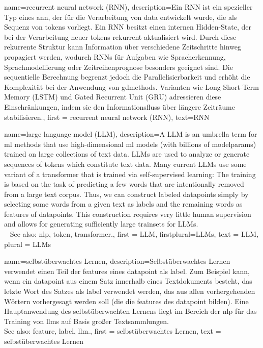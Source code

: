 {name={recurrent neural network (RNN)},
 description={Ein  RNN 
 	ist ein spezieller Typ eines \gls{ann}, der für die Verarbeitung von 
 	\gls{data} entwickelt wurde, die als Sequenz von \glspl{token} vorliegt. 
 	Ein RNN besitzt einen internen Hidden-State, der bei der Verarbeitung neuer 
 	\glspl{token} rekurrent aktualisiert wird. Durch diese rekurrente Struktur kann 
 	Information über verschiedene Zeitschritte hinweg propagiert werden, wodurch 
 	RNNs für Aufgaben wie Spracherkennung, Sprachmodellierung oder Zeitreihenprognose 
 	besonders geeignet sind. 
 	Die sequentielle Berechnung begrenzt jedoch die Parallelisierbarkeit und 
 	erhöht die Komplexität bei der Anwendung von \glspl{gdmethod}. Varianten wie 
 	Long Short-Term Memory (LSTM) und Gated Recurrent Unit (GRU) 
 	adressieren diese Einschränkungen, indem sie den Informationsfluss 
 	über längere Zeiträume stabilisieren.}, 
 first = {recurrent neural network (RNN)},
 text={RNN}
}

{name={large language model (LLM)},
 description={A LLM is an umbrella term for \gls{ml} 
               methods that use high-dimensional \gls{ml} \glspl{model} (with billions 
			   of \glspl{modelparam}) trained on large collections of text \gls{data}. 
 			  LLMs are used to analyze or generate sequences of \glspl{token} which 
               constitute text \gls{data}. Many current LLMs use some variant of 
			   a \gls{transformer} that is trained via self-supervised learning:  
			   The training is based on the task of predicting a few words that 
			   are intentionally removed from a large text corpus. Thus, we can 
			   construct \glspl{labeled datapoint} simply by selecting some words 
			   from a given text as \glspl{label} and the remaining words as \glspl{feature} 
			   of \glspl{datapoint}. This construction requires 
		       very little human supervision and allows for generating sufficiently 
		       large \glspl{trainset} for LLMs.\\ 
			   See also: \gls{nlp}, \gls{token}, \gls{transformer}.}, 
  first = {LLM}, 
  firstplural={LLMs}, 
  text = {LLM}, 
  plural = {LLMs} 
}

{name={selbstüberwachtes Lernen},
 description={Selbstüberwachtes Lernen  verwendet einen Teil 
 	der \glspl{feature} eines \gls{datapoint} als \gls{label}. Zum Beispiel kann, 
 	wenn ein \gls{datapoint} aus einem Satz innerhalb eines Textdokuments besteht, 
 	das letzte Wort des Satzes als \gls{label} verwendet werden, das aus allen 
 	vorhergehenden Wörtern vorhergesagt werden soll (die die \glspl{feature} des 
 	\gls{datapoint} bilden). Eine Hauptanwendung des selbstüberwachten Lernens 
 	liegt im Bereich der \gls{nlp} für das Training von \glspl{llm} auf Basis großer 
 	Textsammlungen.\\
 	See also: \gls{feature}, \gls{label}, \gls{llm}.}, 
 first = {selbstüberwachtes Lernen}, 
 text = {selbstüberwachtes Lernen}
}



